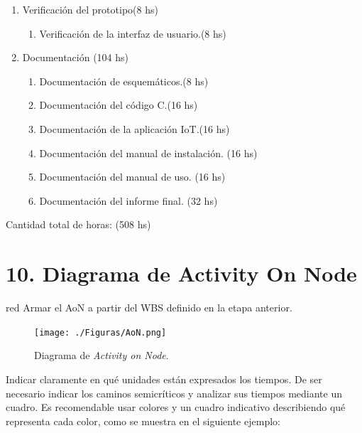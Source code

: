 \documentclass[
11pt, %
]{charter}
\begin{document}
\begin{enumerate}
\item Verificación del prototipo(8 hs)
	\begin{enumerate}
	\item Verificación de la interfaz de usuario.(8 hs)
	\end{enumerate}	
	
\item Documentación	(104 hs)
	\begin{enumerate}
	\item Documentación de esquemáticos.(8 hs)
	\item Documentación del código C.(16 hs)
	\item Documentación de la aplicación IoT.(16 hs)
	\item Documentación del manual de instalación.	(16 hs)
	\item Documentación del manual de uso.	(16 hs)
	\item Documentación del informe final.	(32 hs)

	\end{enumerate}


\end{enumerate}

Cantidad total de horas: (508 hs)



\section{10. Diagrama de Activity On Node}
\label{sec:AoN}

\begin{consigna}{red}
Armar el AoN a partir del WBS definido en la etapa anterior. 



\end{consigna}

\begin{figure}[htpb]
\centering 
\texttt{[image: ./Figuras/AoN.png]}
\caption{Diagrama de \textit{Activity on Node}.}
\label{fig:AoN}
\end{figure}

Indicar claramente en qué unidades están expresados los tiempos.
De ser necesario indicar los caminos semicríticos y analizar sus tiempos mediante un cuadro.
Es recomendable usar colores y un cuadro indicativo describiendo qué representa cada color, como se muestra en el siguiente ejemplo:
\end{document}
